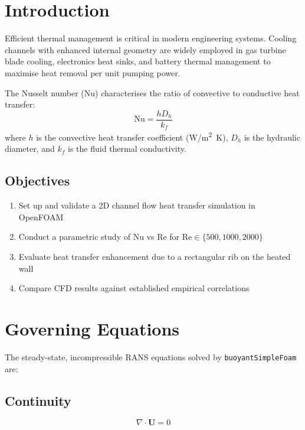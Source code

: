 \documentclass[12pt, a4paper]{article}
\begin{document}
\tableofcontents
\newpage

\section{Introduction}

Efficient thermal management is critical in modern engineering systems. Cooling channels with enhanced internal geometry are widely employed in gas turbine blade cooling, electronics heat sinks, and battery thermal management to maximise heat removal per unit pumping power.

The Nusselt number ($\text{Nu}$) characterises the ratio of convective to conductive heat transfer:
\begin{equation}
    \text{Nu} = \frac{h D_h}{k_f}
\end{equation}
where $h$ is the convective heat transfer coefficient (\si{W/m^2 K}), $D_h$ is the hydraulic diameter, and $k_f$ is the fluid thermal conductivity.

\subsection{Objectives}
\begin{enumerate}
    \item Set up and validate a 2D channel flow heat transfer simulation in OpenFOAM
    \item Conduct a parametric study of Nu vs Re for $\text{Re} \in \{500, 1000, 2000\}$
    \item Evaluate heat transfer enhancement due to a rectangular rib on the heated wall
    \item Compare CFD results against established empirical correlations
\end{enumerate}

\section{Governing Equations}

The steady-state, incompressible RANS equations solved by \texttt{buoyantSimpleFoam} are:

\subsection{Continuity}
\begin{equation}
    \nabla \cdot \mathbf{U} = 0
\end{equation}
\end{document}
